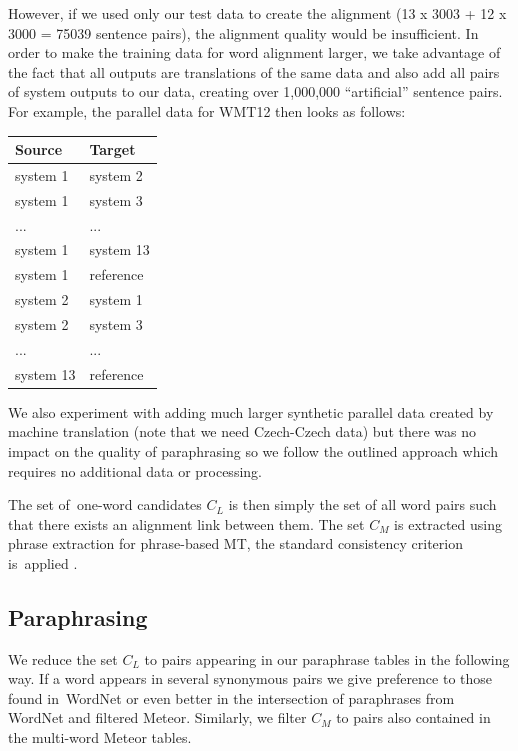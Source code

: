 \documentclass[11pt]{article}
\def\equo#1{``#1''}
\begin{document}
However, if we used only our test data to create the alignment (13 x 3003 + 12 
x 3000 = 75039 sentence pairs), the alignment quality would be insufficient. In 
order to make the training data for word alignment larger, we take advantage of 
the fact that all outputs are translations of the same data and also add all 
pairs of system outputs to our data, creating over 1,000,000 \equo{artificial} 
sentence pairs. For example, the parallel data for WMT12 then looks as follows:

\begin{center}
\begin{tabular}{ll}
Source & Target \\
\hline
system 1 & system 2 \\
system 1 & system 3 \\
... & ...\\
system 1 & system 13 \\
system 1 & reference \\
system 2 & system 1 \\
system 2 & system 3 \\
... & ... \\
system 13 & reference \\
\end{tabular}
\end{center}

We also experiment with adding much larger synthetic parallel data created by
machine translation (note that we need Czech-Czech data) but there was no 
impact on the quality of paraphrasing so we follow the outlined approach which 
requires no additional data or processing.

The set of~one-word candidates $C_L$ is then simply the set of all word pairs 
such that there exists an alignment link between them. The set $C_M$ is 
extracted using phrase extraction for phrase-based MT, the standard consistency 
criterion is~applied \cite{Och99improvedalignment}.

\subsection{Paraphrasing}
We reduce the set $ C_{L} $ to pairs appearing in our paraphrase tables in the 
following way. If a word appears in several synonymous pairs we give preference 
to those found in~WordNet or even better in the intersection of paraphrases 
from WordNet and filtered Meteor. Similarly, we filter $ C_{M} $ to pairs also 
contained in the multi-word Meteor tables.
\end{document}
